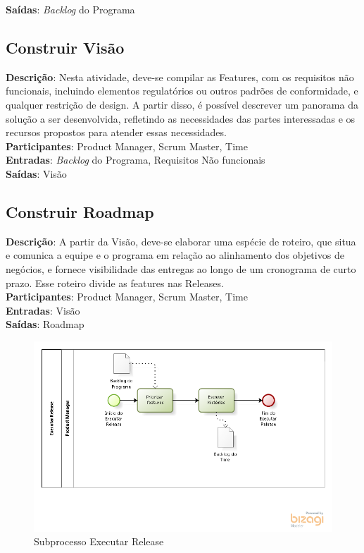   \textbf{Saídas}:  \textit{Backlog} do Programa\\

\subsection{Construir Visão}
  \textbf{Descrição}: Nesta atividade, deve-se compilar as Features, com os requisitos não funcionais, incluindo elementos 
  regulatórios ou outros padrões de conformidade, e qualquer restrição de design. A partir disso, é possível descrever um panorama da solução a 
  ser desenvolvida, refletindo as necessidades das partes interessadas e os recursos propostos para atender essas necessidades. \\
  
  \textbf{Participantes}: Product Manager, Scrum Master, Time \\
  
  \textbf{Entradas}: \textit{Backlog} do Programa, Requisitos Não funcionais \\
  
  \textbf{Saídas}:  Visão\\
  
\subsection{Construir Roadmap}
  \textbf{Descrição}: A partir da Visão, deve-se elaborar uma espécie de roteiro, que situa e comunica a equipe e o programa em relação ao 
  alinhamento dos objetivos de negócios, e fornece visibilidade das entregas ao longo de um cronograma de curto prazo. 
  Esse roteiro divide as features nas Releases. \\
  
  \textbf{Participantes}: Product Manager, Scrum Master, Time \\
  
  \textbf{Entradas}: Visão \\
  
  \textbf{Saídas}:  Roadmap\\

\begin{figure}[!htb]
\centering
\includegraphics[scale=0.7]{figuras/release.png}
\caption{Subprocesso Executar Release}
\label{fig:release}
\end{figure}
  
